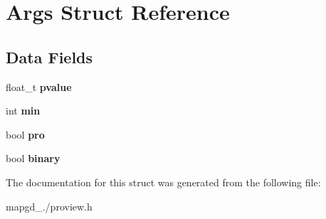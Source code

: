 \hypertarget{structArgs}{\section{Args Struct Reference}
\label{structArgs}
}
\subsection*{Data Fields}
\begin{DoxyCompactItemize}
\item 
\hypertarget{structArgs_a384a1e1af35681f8adac0bebd571d372}{float\-\_\-t {\bfseries pvalue}}\label{structArgs_a384a1e1af35681f8adac0bebd571d372}

\item 
\hypertarget{structArgs_aa631808b16629f4cc4ca7f34f89b3d54}{int {\bfseries min}}\label{structArgs_aa631808b16629f4cc4ca7f34f89b3d54}

\item 
\hypertarget{structArgs_a825d174b8accceddff970b7c1594f36c}{bool {\bfseries pro}}\label{structArgs_a825d174b8accceddff970b7c1594f36c}

\item 
\hypertarget{structArgs_a244a8043a10a91b647ceb08a3d6fef9f}{bool {\bfseries binary}}\label{structArgs_a244a8043a10a91b647ceb08a3d6fef9f}

\end{DoxyCompactItemize}


The documentation for this struct was generated from the following file\-:\begin{DoxyCompactItemize}
\item 
mapgd\-\_./proview.\-h\end{DoxyCompactItemize}
